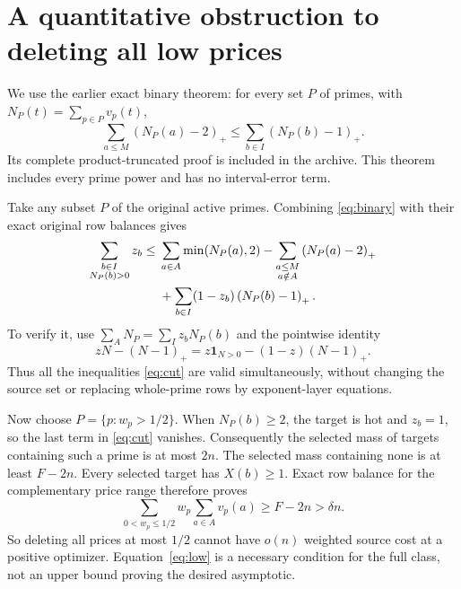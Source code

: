 \documentclass[a4paper,11pt]{article}
\newcommand{\pos}[1]{\left(#1\right)_+}
\begin{document}
\section{A quantitative obstruction to deleting all low prices}
We use the earlier exact binary theorem: for every set $P$ of primes, with $N_P(t)=\sum_{p\in P}v_p(t)$,
\begin{equation}\label{eq:binary}
 \sum_{a\le M}\pos{N_P(a)-2}
 \le\sum_{b\in I}\pos{N_P(b)-1}.
\end{equation}
Its complete product-truncated proof is included in the archive. This theorem includes every prime power and has no interval-error term.

Take any subset $P$ of the original active primes. Combining \eqref{eq:binary} with their exact original row balances gives
\begin{align}
 \sum_{\substack{b\in I\\N_P(b)>0}}z_b
 \le{}&\sum_{a\in A}\min(N_P(a),2)
       -\sum_{\substack{a\le M\\a\notin A}}\pos{N_P(a)-2}\notag\\
 &+\sum_{b\in I}(1-z_b)\pos{N_P(b)-1}.\label{eq:cut}
\end{align}
To verify it, use $\sum_A N_P=\sum_Iz_bN_P(b)$ and the pointwise identity
\[
 zN-(N-1)_+=z\mathbf1_{N>0}-(1-z)(N-1)_+.
\]
Thus all the inequalities \eqref{eq:cut} are valid simultaneously, without changing the source set or replacing whole-prime rows by exponent-layer equations.

Now choose $P=\{p:w_p>1/2\}$. When $N_P(b)\ge2$, the target is hot and $z_b=1$, so the last term in \eqref{eq:cut} vanishes. Consequently the selected mass of targets containing such a prime is at most $2n$. The selected mass containing none is at least $F-2n$. Every selected target has $X(b)\ge1$. Exact row balance for the complementary price range therefore proves
\begin{equation}\label{eq:low}
 \boxed{\sum_{0<w_p\le1/2} w_p\sum_{a\in A}v_p(a)
       \ge F-2n>\delta n.}
\end{equation}
So deleting all prices at most $1/2$ cannot have $o(n)$ weighted source cost at a positive optimizer. Equation~\eqref{eq:low} is a necessary condition for the full class, not an upper bound proving the desired asymptotic.
\end{document}
